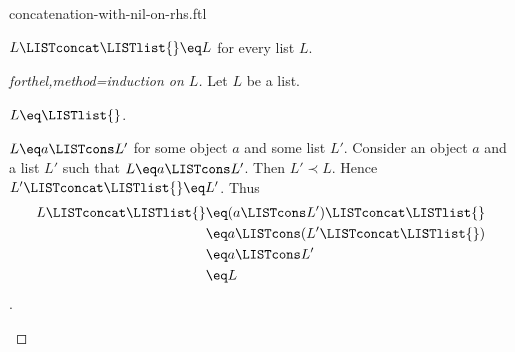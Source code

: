\documentclass{naproche-library}
\begin{document}
\begin{smodule}[title=Concatenation with Nil on the Right-Hand Side]{concatenation-with-nil-on-rhs.ftl}

\begin{proposition}[forthel,id=RightConcatNilProp]
  $L \LISTconcat \LISTlist{} \eq L$ for every list $L$.
\end{proposition}
\begin{proof}[forthel,method=induction on $L$]
  Let $L$ be a list.

  \begin{case}{$L \eq \LISTlist{}$.} \end{case}
  
  \begin{case}{$L \eq a \LISTcons L'$ for some object $a$ and some list $L'$.}
    Consider an object $a$ and a list $L'$ such that $L \eq a \LISTcons L'$.
    Then $L' \prec L$.
    Hence $L' \LISTconcat \LISTlist{} \eq L'$.
    Thus
    \begin{align*}
      L \LISTconcat \LISTlist{}
        &\eq (a \LISTcons L') \LISTconcat \LISTlist{}\\
        &\eq a \LISTcons (L' \LISTconcat \LISTlist{})\\
        &\eq a \LISTcons L'\\
        &\eq L
    \end{align*}.
  \end{case}
\end{proof}
\end{smodule}
\end{document}
